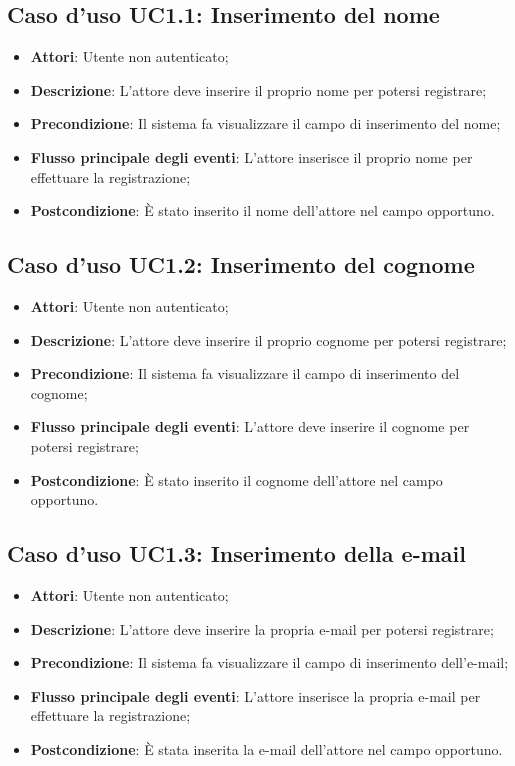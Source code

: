 \subsection{Caso d'uso \texorpdfstring{UC1.1}{UC1.1}: Inserimento del nome}
\begin{itemize}
	\item \textbf{Attori}: Utente non autenticato;
	\item \textbf{Descrizione}: L'attore deve inserire il proprio nome per potersi registrare;
	\item \textbf{Precondizione}: Il sistema fa visualizzare il campo di inserimento del nome;
	\item \textbf{Flusso principale degli eventi}: L'attore inserisce il proprio nome per effettuare la registrazione;
	\item \textbf{Postcondizione}: È stato inserito il nome dell'attore nel campo opportuno.
\end{itemize}
\subsection{Caso d'uso \texorpdfstring{UC1.2}{UC1.2}: Inserimento del cognome}
\begin{itemize}
	\item \textbf{Attori}: Utente non autenticato;
	\item \textbf{Descrizione}: L'attore deve inserire il proprio cognome per potersi registrare;
	\item \textbf{Precondizione}: Il sistema fa visualizzare il campo di inserimento del cognome;
	\item \textbf{Flusso principale degli eventi}: L'attore deve inserire il cognome per potersi registrare;
	\item \textbf{Postcondizione}: È stato inserito il cognome dell'attore nel campo opportuno.
\end{itemize}
\subsection{Caso d'uso \texorpdfstring{UC1.3}{UC1.3}: Inserimento della e-mail}
\begin{itemize}
	\item \textbf{Attori}: Utente non autenticato;
	\item \textbf{Descrizione}: L'attore deve inserire la propria e-mail per potersi registrare;
	\item \textbf{Precondizione}: Il sistema fa visualizzare il campo di inserimento dell'e-mail;
	\item \textbf{Flusso principale degli eventi}: L'attore inserisce la propria e-mail per effettuare la registrazione;
	\item \textbf{Postcondizione}: È stata inserita la e-mail dell'attore nel campo opportuno.
\end{itemize}
